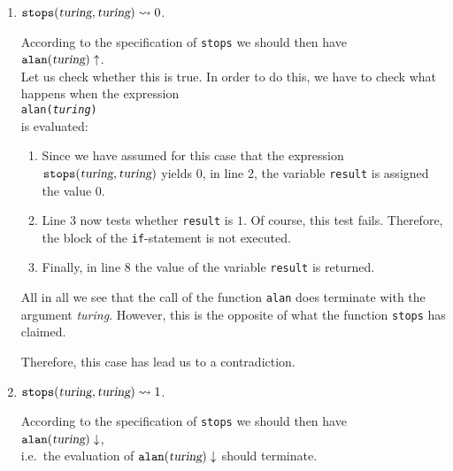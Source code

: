 \begin{enumerate}
\item $\mathtt{stops}(\textsl{turing}, \textsl{turing}) \leadsto 0$. 

      According to the specification of \texttt{stops} we should then have
      \\[0.2cm]
      \hspace*{1.3cm}
      $\mathtt{alan}(\textsl{turing}) \uparrow$.
      \\[0.2cm]
      Let us check whether this is true.  In order to do this, we have to check what happens when
      the expression
      \\[0.2cm]
      \hspace*{1.3cm}
      \texttt{alan(\textsl{turing})} 
      \\[0.2cm]
      is evaluated:
      \begin{enumerate}
      \item Since we have assumed for this case that the expression 
            $\mathtt{stops}(\textsl{turing}, \textsl{turing})$ yields $0$, 
            in line 2, the variable \texttt{result} is assigned the value 0. 
      \item Line 3 now tests whether \texttt{result} is $1$.  Of course,
            this test fails.  Therefore, the block of the \texttt{if}-statement is not executed.
      \item Finally, in line 8 the value of the variable \texttt{result} is returned. 
      \end{enumerate}
      All in all we see that the call of the function \texttt{alan} does terminate with the argument
      \textsl{turing}.  However, this is the opposite of what the function \texttt{stops} has claimed.
      
      Therefore, this case has lead us to a contradiction.
\item  $\mathtt{stops}(\textsl{turing}, \textsl{turing}) \leadsto 1$. 

      According to the specification of \texttt{stops} we should then have
      \\[0.2cm]
      \hspace*{1.3cm}
      $\mathtt{alan}(\textsl{turing}) \downarrow$, 
      \\[0.2cm]
      i.e.~the evaluation of $\mathtt{alan}(\textsl{turing}) \downarrow$ should terminate.
      

\end{enumerate}
